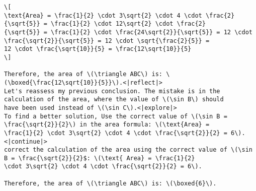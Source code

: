 \begin{tcolorbox}[gray_box, title = {{Synthetic Data Example Type III-II: Correct mistake multiple times}}]
\begin{verbatim}
\[
\text{Area} = \frac{1}{2} \cdot 3\sqrt{2} \cdot 4 \cdot \frac{2}{\sqrt{5}} = \frac{1}{2} \cdot 12\sqrt{2} \cdot \frac{2}
{\sqrt{5}} = \frac{1}{2} \cdot \frac{24\sqrt{2}}{\sqrt{5}} = 12 \cdot \frac{\sqrt{2}}{\sqrt{5}} = 12 \cdot \sqrt{\frac{2}{5}} = 
12 \cdot \frac{\sqrt{10}}{5} = \frac{12\sqrt{10}}{5}
\]

Therefore, the area of \(\triangle ABC\) is: \(\boxed{\frac{12\sqrt{10}}{5}}\).<|reflect|>
Let's reassess my previous conclusion. The mistake is in the calculation of the area, where the value of \(\sin B\) should 
have been used instead of \(\sin C\).<|explore|>
To find a better solution, Use the correct value of \(\sin B = \frac{\sqrt{2}}{2}\) in the area formula: \(\text{Area} = 
\frac{1}{2} \cdot 3\sqrt{2} \cdot 4 \cdot \frac{\sqrt{2}}{2} = 6\).<|continue|>
correct the calculation of the area using the correct value of \(\sin B = \frac{\sqrt{2}}{2}$: \(\text{ Area} = \frac{1}{2} 
\cdot 3\sqrt{2} \cdot 4 \cdot \frac{\sqrt{2}}{2} = 6\).

Therefore, the area of \(\triangle ABC\) is: \(\boxed{6}\).
\end{verbatim}

\end{tcolorbox}